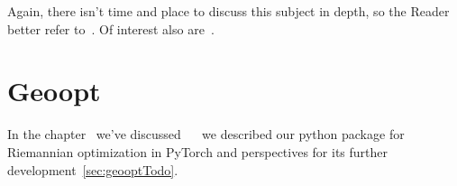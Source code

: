 Again, there isn't time and place to discuss this subject in depth, so the
Reader better refer to~\citet{leeRiem}.  Of interest also
are~\citet{feyCurv,gravityLight,burago}.

\section{Geoopt}

In the chapter~ we've discussed
~~\cite{geoopt} we described our python package for
Riemannian optimization in PyTorch and perspectives for its further
development~\autoref{sec:geooptTodo}.
